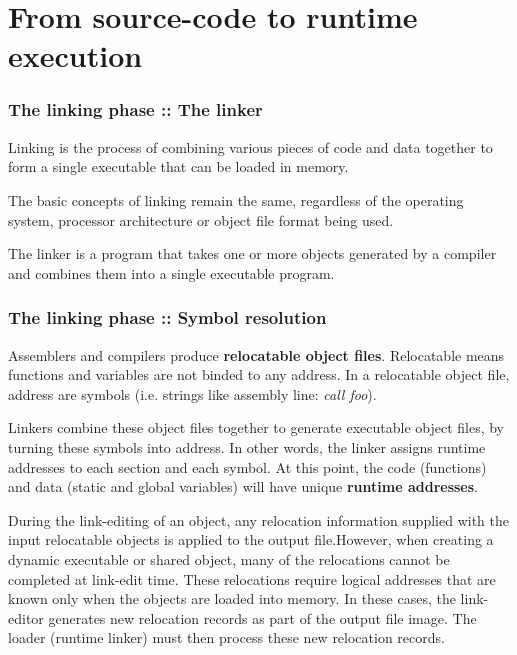 %
%

\section{From source-code to runtime execution}


\begin{frame}
  \frametitle{The linking phase :: The linker}

Linking is the process of combining various pieces of code and data together
to form a single executable that can be loaded in memory.

\-

The basic concepts of linking remain the same, regardless of the operating system,
processor architecture or object file format being used.

\-

The linker is a program that takes one or more objects generated by a compiler and combines them
into a single executable program.

\end{frame}


\begin{frame}
  \frametitle{The linking phase :: Symbol resolution}

Assemblers and compilers produce \textbf{relocatable object files}. Relocatable means functions
and variables are not binded to any address. In a relocatable object file, address are symbols
(i.e. strings like assembly line: \textit{call foo}).

\-

Linkers combine these object files together to generate executable object files, by
turning these symbols into address. In other words, the linker assigns runtime
addresses to each section and each symbol. At this point, the code (functions) and data
(static and global variables) will have unique \textbf{runtime addresses}.

\-

During the link-editing of an object, any relocation information supplied with the input
relocatable objects is applied to the output file.However, when creating a dynamic executable or
shared object, many of the relocations cannot be completed at link-edit time. These relocations
require logical addresses that are known only when the objects are loaded into memory. In these
cases, the link-editor generates new relocation records as part of the output file image. The
loader (runtime linker) must then process these new relocation records.


\end{frame}

